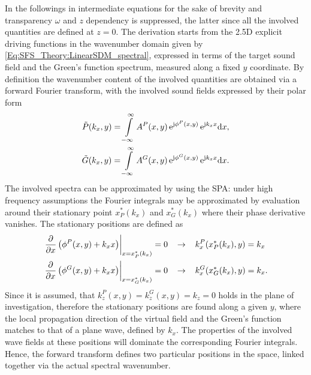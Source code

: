 In the followings in intermediate equations for the sake of brevity and transparency $\omega$ and $z$ dependency is suppressed, the latter since all the involved quantities are defined at $z=0$.
The derivation starts from the 2.5D explicit driving functions in the wavenumber domain given by \eqref{Eq:SFS_Theory:LinearSDM_spectral}, expressed in terms of the target sound field and the Green's function spectrum, measured along a fixed $y$ coordinate.
By definition the wavenumber content of the involved quantities are obtained via a forward Fourier transform, with the involved sound fields expressed by their polar form
\begin{align} 
\tilde{P}(k_x,y) = \int\limits_{-\infty}^{\infty} A^P(x,y) \, \mathrm{e}^{\mathrm{j} \phi^P(x,y)} \, \mathrm{e}^{\mathrm{j} k_x x} \mathrm{d} x, \\
\tilde{G}(k_x,y) = \int\limits_{-\infty}^{\infty} A^G(x,y) \, \mathrm{e}^{\mathrm{j} \phi^G(x,y)} \, \mathrm{e}^{\mathrm{j} k_x x} \mathrm{d} x.
\end{align}
The involved spectra can be approximated by using the SPA:
under high frequency assumptions the Fourier integrals may be approximated by evaluation around their stationary point $x^*_P(k_x)$ and $x^*_G(k_x)$ where their phase derivative vanishes. 
The stationary positions are defined as
\begin{align}	
\label{eq:xP_xG_in_spatial_domain}
\left. \frac{\partial}{\partial x} \left(  \phi^P(x,y) + k_x x \right )\right|_{x = x^*_P(k_x)} = 0
\hspace{3mm} &\rightarrow \hspace{3mm}
k_x^P(x^*_P(k_x),y) = k_x \nonumber
\\ 
\left. \frac{\partial}{\partial x} \left( \phi^G(x,y) + k_x x \right )\right|_{x = x^*_G(k_x)} = 0
\hspace{3mm} &\rightarrow \hspace{3mm}
k_x^G(x^*_G(k_x),y) = k_x.
\end{align}
Since it is assumed, that $k_z^P(x,y) = k_z^G(x,y) = k_z = 0$ holds in the plane of investigation, therefore the stationary positions are found along a given $y$, where the local propagation direction of the virtual field and the Green's function matches to that of a plane wave, defined by $k_x$.
The properties of the involved wave fields at these positions will dominate the corresponding Fourier integrals.
Hence, the forward transform defines two particular positions in the space, linked together via the actual spectral wavenumber.

